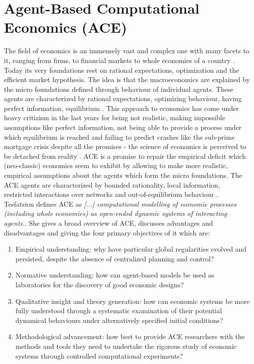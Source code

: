 \section{Agent-Based Computational Economics (ACE)}
The field of economics is an immensely vast and complex one with many facets to it, ranging from firms, to financial markets to whole economies of a country \cite{bowles_understanding_2005}. Today its very foundations rest on rational expectations, optimization and the efficient market hypothesis. The idea is that the macroeconomics are explained by the micro foundations \cite{colell_microeconomic_1995} defined through behaviour of individual agents. These agents are characterized by rational expectations, optimizing behaviour, having perfect information, equilibrium \cite{focardi_is_2015}.
This approach to economics has come under heavy critizism in the last years for being not realistic, making impossible assumptions like perfect information, not being able to provide a process under which equilibrium is reached \cite{kirman_complex_2010} and failing to predict crashes like the sub-prime mortgage crisis despite all the promises - the science of economics is perceived to be detached from reality \cite{focardi_is_2015}. 
ACE is a promise to repair the empirical deficit which (neo-classic) economics seem to exhibit by allowing to make more realistic, empirical assumptions about the agents which form the micro foundations. The ACE agents are characterized by bounded rationality, local information, restricted interactions over networks and out-of-equilibrium behaviour \cite{farmer_economy_2009}. 
Tesfatsion \cite{tesfatsion_agent-based_2017} defines ACE as \textit{[...] computational modelling of economic processes (including whole economies) as open-ended dynamic systems of interacting agents.}. She gives a broad overview \cite{tesfatsion_agent-based_2006} of ACE, discusses advantages and disadvantages and giving the four primary objectives of it which are:

\begin{enumerate}
	\item Empirical understanding: why have particular global regularities evolved and persisted, despite the absence of centralized planning and control?
	\item Normative understanding: how can agent-based models be used as laboratories for the discovery of good economic designs?
	\item Qualitative insight and theory generation: how can economic systems be more fully understood through a systematic examination of their potential dynamical behaviours under alternatively specified initial conditions?
	\item Methodological advancement: how best to provide ACE researchers with the methods and tools they need to undertake the rigorous study of economic systems through controlled computational experiments?
\end{enumerate}


